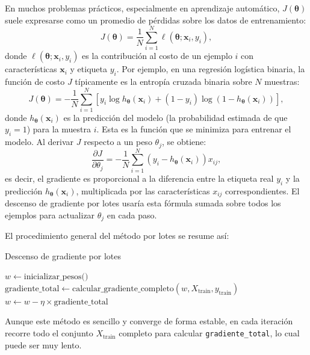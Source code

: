 \documentclass[12pt, spanish]{article}
\begin{document}
En muchos problemas prácticos, especialmente en aprendizaje automático, $J(\boldsymbol{\theta})$ suele expresarse como un promedio de pérdidas sobre los datos de entrenamiento:
\[
J(\boldsymbol{\theta}) = \frac{1}{N} \sum_{i=1}^N \ell(\boldsymbol{\theta}; \mathbf{x}_i, y_i),
\]
donde $\ell(\boldsymbol{\theta}; \mathbf{x}_i, y_i)$ es la contribución al costo de un ejemplo $i$ con características $\mathbf{x}_i$ y etiqueta $y_i$. Por ejemplo, en una regresión logística binaria, la función de costo $J$ típicamente es la entropía cruzada binaria sobre $N$ muestras:
\[
J(\boldsymbol{\theta}) = -\frac{1}{N} \sum_{i=1}^N \left[ y_i \log h_{\boldsymbol{\theta}}(\mathbf{x}_i) + (1 - y_i) \log(1 - h_{\boldsymbol{\theta}}(\mathbf{x}_i)) \right],
\]
donde $h_{\boldsymbol{\theta}}(\mathbf{x}_i)$ es la predicción del modelo (la probabilidad estimada de que $y_i=1$) para la muestra $i$. Esta es la función que se minimiza para entrenar el modelo. Al derivar $J$ respecto a un peso $\theta_j$, se obtiene:
\[
\frac{\partial J}{\partial \theta_j} = -\frac{1}{N} \sum_{i=1}^N (y_i - h_{\boldsymbol{\theta}}(\mathbf{x}_i)) x_{ij},
\]
es decir, el gradiente es proporcional a la diferencia entre la etiqueta real $y_i$ y la predicción $h_{\boldsymbol{\theta}}(\mathbf{x}_i)$, multiplicada por las características $x_{ij}$ correspondientes. El descenso de gradiente por lotes usaría esta fórmula sumada sobre todos los ejemplos para actualizar $\theta_j$ en cada paso.

El procedimiento general del método por lotes se resume así:

\begin{algorithm}[H]
\caption{Descenso de gradiente por lotes}
\begin{algorithmic}[1]
\State $w \gets \text{inicializar\_pesos()}$
    \State $\text{gradiente\_total} \gets \text{calcular\_gradiente\_completo}(w, X_{\text{train}}, y_{\text{train}})$
    \State $w \gets w - \eta \times \text{gradiente\_total}$ 
\EndFor
\end{algorithmic}
\end{algorithm}

Aunque este método es sencillo y converge de forma estable, en cada iteración recorre todo el conjunto $X_{\text{train}}$ completo para calcular \texttt{gradiente\_total}, lo cual puede ser muy lento.
\end{document}
